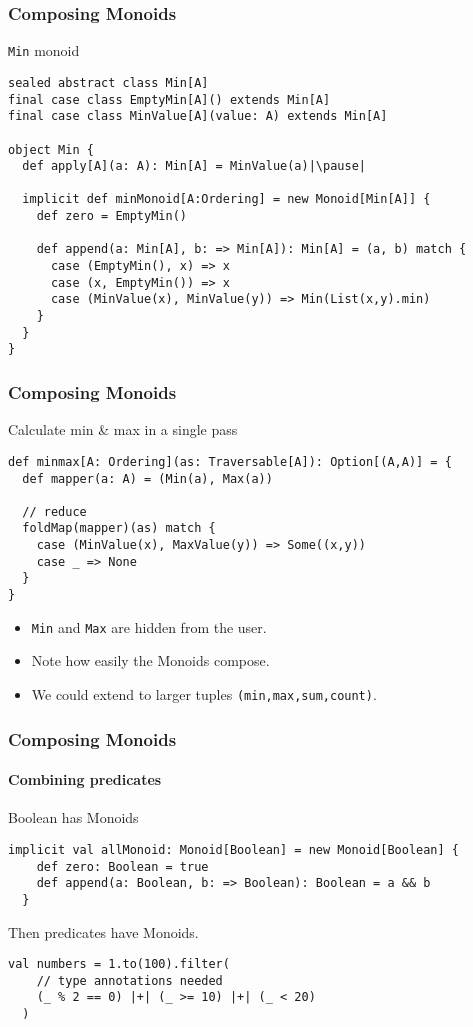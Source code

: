 \documentclass{beamer}
\begin{document}
\begin{frame}[fragile]
  \frametitle{Composing Monoids}
  \begin{block}{\texttt{Min} monoid}
  \begin{lstlisting}[escapechar=\|]
sealed abstract class Min[A]
final case class EmptyMin[A]() extends Min[A]
final case class MinValue[A](value: A) extends Min[A]

object Min {
  def apply[A](a: A): Min[A] = MinValue(a)|\pause|

  implicit def minMonoid[A:Ordering] = new Monoid[Min[A]] {
    def zero = EmptyMin()

    def append(a: Min[A], b: => Min[A]): Min[A] = (a, b) match {
      case (EmptyMin(), x) => x
      case (x, EmptyMin()) => x
      case (MinValue(x), MinValue(y)) => Min(List(x,y).min)
    }
  }
}
  \end{lstlisting}
  \end{block}
\end{frame}

\begin{frame}[fragile]
  \frametitle{Composing Monoids}
  \begin{block}{Calculate min \& max in a single pass}
  \begin{lstlisting}[escapechar=\|]
def minmax[A: Ordering](as: Traversable[A]): Option[(A,A)] = {
  def mapper(a: A) = (Min(a), Max(a))

  // reduce
  foldMap(mapper)(as) match {
    case (MinValue(x), MaxValue(y)) => Some((x,y))
    case _ => None
  }
}
  \end{lstlisting}
  \end{block}

  \begin{itemize}
    \item \texttt{Min} and \texttt{Max} are hidden from the user.
    \item Note how easily the Monoids compose.
    \item We could extend to larger tuples \texttt{(min,max,sum,count)}.
  \end{itemize}
\end{frame}

\begin{frame}[fragile]
  \frametitle{Composing Monoids}
  \framesubtitle{Combining predicates}
  \begin{block}{Boolean has Monoids}
  \begin{lstlisting}[escapechar=~]
  implicit val allMonoid: Monoid[Boolean] = new Monoid[Boolean] {
    def zero: Boolean = true
    def append(a: Boolean, b: => Boolean): Boolean = a && b
  }
  \end{lstlisting}
  \end{block}
  \pause
  Then predicates have Monoids.
  \begin{block}{}
  \begin{lstlisting}[escapechar=~]
  val numbers = 1.to(100).filter(
    // type annotations needed
    (_ % 2 == 0) |+| (_ >= 10) |+| (_ < 20)
  )
  \end{lstlisting}
  \end{block}
\end{frame}
\end{document}
